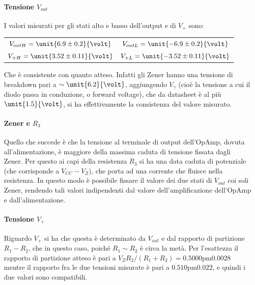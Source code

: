 \documentclass[10pt,a4paper]{article}
\begin{document}
\paragraph{Tensione $V_{out}$} I valori misurati per gli stati alto e basso dell'output e di $V_+$ sono:

\begin{table}[H]
	\centering
	\begin{tabular}{cc}
        $ V_{out H} = \unit{6.9 \pm 0.2}{\volt}$  & $V_{out L} = \unit{-6.9 \pm 0.2}{\volt}$\\
        $ V_{+ H} = \unit{3.52 \pm 0.11}{\volt}$  & $V_{+ L} = \unit{-3.52 \pm 0.11}{\volt}$
	\end{tabular}
\end{table}

Che è consistente con quanto atteso. Infatti gli Zener hanno una tensione di breakdown pari a $\sim \unit{6.2}{\volt}$, aggiungendo $V_\gamma$ (cioè la tensione a cui il diodo passa in conduzione, o forward voltage), che da datasheet è al più $\unit{1.5}{\volt}$, si ha effettivamente la consistenza del valore misurato.

\paragraph{Zener e $R_3$} Quello che succede è che la tensione al terminale di output dell'OpAmp, dovuta all'alimentazione, è maggiore della massima caduta di tensione fissata dagli Zener. Per questo ai capi della resistenza $R_3$ si ha una data caduta di potenziale (che corrisponde a $V_{CC}-V_Z$), che porta ad una corrente che fluisce nella resistenza. In questo modo è possibile fissare il valore dei due stati di $V_{out}$ coi soli Zener, rendendo tali valori indipendenti dal valore dell'amplificazione dell'OpAmp e dall'alimentazione.

\paragraph{Tensione $V_+$} Riguardo $V_+$ si ha che questa è determinato da $V_{out}$ e dal rapporto di partizione $R_1 - R_2$, che in questo caso, poiché $R_1 \sim R_2$ è circa la metà. Per l'esattezza il rapporto di partizione atteso è pari a $V_Z R_2/(R_1 + R_2) = \unit{0.5000 \pm 0.0028}$ mentre il rapporto fra le due tensioni misurate è pari a $\unit{0.510 \pm 0.022}$, e quindi i due valori sono compatibili.
\end{document}
